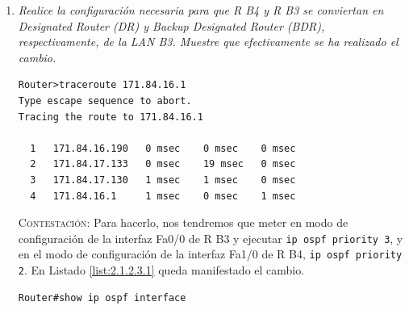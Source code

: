 \documentclass[twoside, 11pt]{article}
\begin{document}
\begin{enumerate}
\begin{equation*}
    \begin{split}
        \text{171.84.16.189 (R B4)} &\xrightarrow[\text{Fa1/0}]{} \text{171.84.16.190 (R B3)} \\
        &\xrightarrow[\text{Se2/0}]{} \text{171.84.17.133 (R B1)} \\
        &\xrightarrow[\text{Se2/0}]{} \text{171.84.17.130 (R B2)} \\
        &\xrightarrow[\text{Fa0/0}]{} \text{171.84.16.1 (H B2)}.
    \end{split}
\end{equation*}

$\hfill\square$

\vspace{12px}

\item \textit{Realice la configuración necesaria para que R B4 y R B3 se
conviertan en Designated Router (DR) y Backup Designated Router (BDR), respectivamente, de la LAN B3. Muestre que efectivamente se ha realizado el cambio.}
\label{ej:2.1.2.3}

\vspace{7px}

\begin{center}
\begin{verbatim}
Router>traceroute 171.84.16.1
Type escape sequence to abort.
Tracing the route to 171.84.16.1

  1   171.84.16.190   0 msec    0 msec    0 msec    
  2   171.84.17.133   0 msec    19 msec   0 msec    
  3   171.84.17.130   1 msec    1 msec    0 msec    
  4   171.84.16.1     1 msec    0 msec    1 msec    
\end{verbatim}
\label{list:2.1.2.2}
\end{center}

\textsc{Contestación}: Para hacerlo, nos tendremos que meter en modo de configuración de la interfaz Fa0/0 de R B3 y ejecutar \texttt{ip ospf priority 3}, y en el modo de configuración de la interfaz Fa1/0 de R B4, \texttt{ip ospf priority 2}. En Listado \ref{list:2.1.2.3.1} queda manifestado el cambio.

\begin{center}
\begin{verbatim}
Router#show ip ospf interface 


\end{verbatim}
\end{center}
\end{enumerate}
\end{document}
